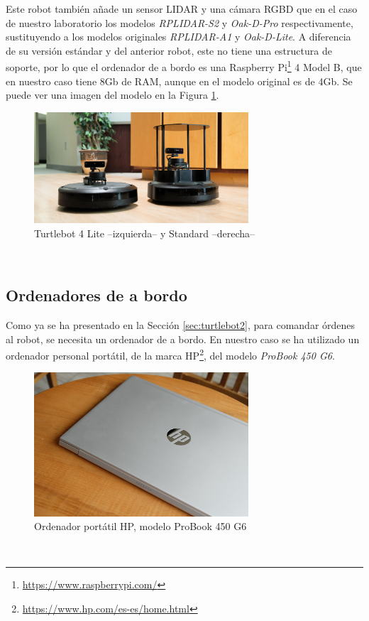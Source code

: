 Este robot también añade un sensor LIDAR y una cámara RGBD que en el caso de
nuestro laboratorio los modelos \textit{RPLIDAR-S2} y \textit{Oak-D-Pro}
respectivamente, sustituyendo a los modelos originales \textit{RPLIDAR-A1} y
\textit{Oak-D-Lite}.
A diferencia de su versión estándar y del anterior robot, este no tiene una
estructura de soporte, por lo que el ordenador de a bordo es una Raspberry
Pi\footnote{\url{https://www.raspberrypi.com/}} 4 Model B, que en nuestro caso
tiene 8Gb de RAM, aunque en el modelo original es de 4Gb.
Se puede ver una imagen del modelo en la Figura \ref{fig:turtlebot4}.

\begin{figure} [h!]
  \begin{center}
    \includegraphics[width=8cm]{figs/turtlebot4}
  \end{center}
  \caption{Turtlebot 4 Lite --izquierda-- y Standard --derecha-- \citep{turtlebot4}}
  \label{fig:turtlebot4}
\end{figure}\


\subsection{Ordenadores de a bordo}
\label{sec:a_bordo}

Como ya se ha presentado en la Sección \ref{sec:turtlebot2}, para comandar
órdenes al robot, se necesita un ordenador de a bordo.
En nuestro caso se ha utilizado un ordenador personal portátil, de la marca
HP\footnote{\url{https://www.hp.com/es-es/home.html}}, del modelo
\textit{ProBook 450 G6}.

\begin{figure} [h!]
  \begin{center}
    \includegraphics[width=8cm]{figs/hp_probook}
  \end{center}
  \caption{Ordenador portátil HP, modelo ProBook 450 G6 \citep{hp_probook}}
  \label{fig:hp_probook}
\end{figure}\

